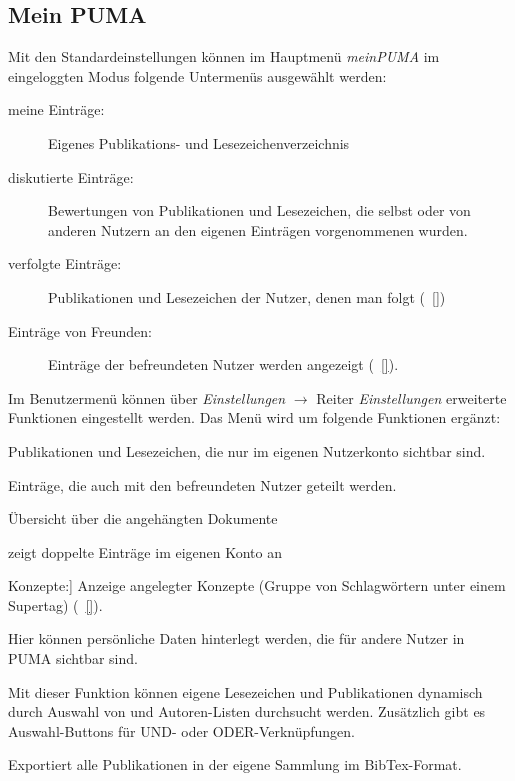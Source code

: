 \subsection*{Mein PUMA}
\label{subsec:meinPuma}
Mit den Standardeinstellungen  können im Hauptmenü \textit{meinPUMA} im eingeloggten Modus folgende Untermenüs ausgewählt werden:
\begin{description}
\item [meine Einträge:] Eigenes Publikations- und Lesezeichenverzeichnis
\item [diskutierte Einträge:] Bewertungen von Publikationen und Lesezeichen, die selbst oder von anderen Nutzern an den eigenen Einträgen vorgenommenen wurden. 
\item [verfolgte Einträge:] Publikationen und Lesezeichen der Nutzer, denen man folgt (~\autoref{}) 
\item [Einträge von Freunden:] Einträge der befreundeten Nutzer werden angezeigt (~\autoref{}).
\end{description}
Im Benutzermenü können über \textit{Einstellungen} $\to$ Reiter \textit{Einstellungen} erweiterte Funktionen eingestellt werden. Das Menü wird um folgende Funktionen ergänzt:
\begin{description}
\item [private Einträge:] Publikationen und Lesezeichen, die nur im eigenen Nutzerkonto sichtbar sind. 
\item [Einträge für Freunde:] Einträge, die auch mit den befreundeten Nutzer geteilt werden.
\item [Dokumente:] Übersicht über die angehängten Dokumente
\item [Duplikate:] zeigt doppelte Einträge im eigenen Konto an
\item Konzepte:] Anzeige angelegter Konzepte (Gruppe von Schlagwörtern unter einem Supertag) (~\autoref{}). 
\item [Lebenslauf\index{Lebenslauf}:] Hier können persönliche Daten hinterlegt werden, die für andere Nutzer in PUMA sichtbar sind.
\item [Publikationen durchstöbern:] Mit dieser Funktion können eigene Lesezeichen und Publikationen dynamisch durch Auswahl von \tags und Autoren-Listen durchsucht werden. Zusätzlich gibt es Auswahl-Buttons für UND- oder ODER-Verknüpfungen.
\item [BibTex\index{BibTex} exportieren:] Exportiert alle Publikationen in der eigene Sammlung im BibTex-Format.
\end{description}

